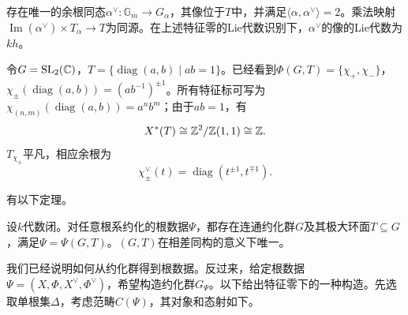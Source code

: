 存在唯一的余根同态$\alpha^\vee:\mathbb G_m\to G_\alpha$，其像位于$T$中，并满足$\langle\alpha,\alpha^\vee\rangle=2$。乘法映射$\operatorname{Im}(\alpha^\vee)\times T_\alpha\to T$为同源。在上述特征零的Lie代数识别下，$\alpha^\vee$的像的Lie代数为$kh$。
\begin{example}\label{L18S2O3}
令$G=\operatorname{SL}_2(\mathbb{C})$，$T=\{\operatorname{diag}(a,b)\mid ab=1\}$。已经看到$\Phi(G,T)=\{\chi_+,\chi_-\}$，$\chi_\pm(\operatorname{diag}(a,b))=(ab^{-1})^{\pm1}$。所有特征标可写为$\chi_{(n,m)}(\operatorname{diag}(a,b))=a^nb^m$；由于$ab=1$，有
\[X^*(T)\cong\mathbb{Z}^2/\mathbb{Z}(1,1)\cong\mathbb{Z}.\]
$T_{\chi_\pm}$平凡，相应余根为
\[\chi_\pm^\vee(t)=\operatorname{diag}(t^{\pm1},t^{\mp1}).\]
\end{example}
有以下定理。
\begin{theorem}\label{L18S2O4}
设$k$代数闭。对任意根系约化的根数据$\Psi$，都存在连通约化群$G$及其极大环面$T\subseteq G$，满足$\Psi=\Psi(G,T)$。$(G,T)$在相差同构的意义下唯一。
\end{theorem}
我们已经说明如何从约化群得到根数据。反过来，给定根数据$\Psi=(X,\Phi,X^\vee,\Phi^\vee)$，希望构造约化群$G_\Psi$。以下给出特征零下的一种构造。先选取单根集$\Delta$，考虑范畴$C(\Psi)$，其对象和态射如下。

